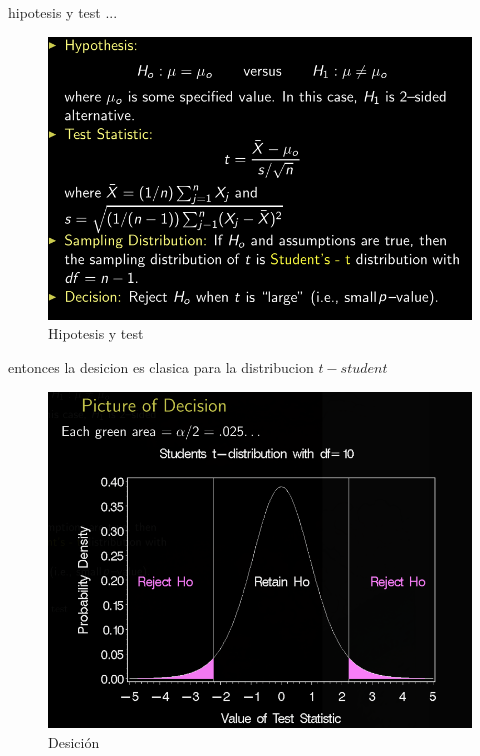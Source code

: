 \documentclass[10pt,a4paper]{article} %
\begin{document}
        \newpage
        hipotesis y test ...

        \begin{figure}[h!]
            \centering
            \includegraphics[width=0.8\linewidth]{hip.png}
            \caption{Hipotesis y test}
            \label{test}
        \end{figure}

        \newpage
        entonces la desicion es clasica para la distribucion $ t-student  $
        \begin{figure}[h!]
            \centering
            \includegraphics[width=0.8\linewidth]{des.png}
            \caption{Desición}
            \label{des}
        \end{figure}
\end{document}
